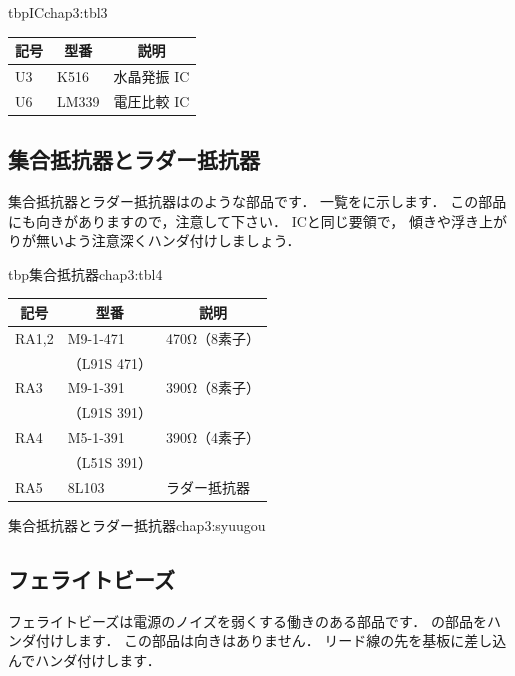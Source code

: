 \begin{mytable}{tbp}{IC}{chap3:tbl3}
{\small\begin{tabular}{l|l|l}
\hline
\hline
\multicolumn{1}{c|}{記号} &
\multicolumn{1}{c|}{型番} &
\multicolumn{1}{c}{説明} \\
\hline
U3 & K516       & 水晶発振 IC \\
U6 & LM339      & 電圧比較 IC \\
\end{tabular}}
\end{mytable}



\subsection{集合抵抗器とラダー抵抗器}
集合抵抗器とラダー抵抗器はのような部品です．
一覧をに示します．
この部品にも向きがありますので，注意して下さい．
ICと同じ要領で，
傾きや浮き上がりが無いよう注意深くハンダ付けしましょう．

\begin{mytable}{tbp}{集合抵抗器}{chap3:tbl4}
{\small\begin{tabular}{l|l|l}
\hline
\hline
\multicolumn{1}{c|}{記号} &
\multicolumn{1}{c|}{型番} &
\multicolumn{1}{c}{説明} \\
\hline
RA1,2 & M9-1-471   & 470Ω（8素子） \\
      &（L91S 471）&               \\
RA3   & M9-1-391   & 390Ω（8素子） \\
      &（L91S 391）&               \\
RA4   & M5-1-391   & 390Ω（4素子） \\
      &（L51S 391）&               \\
RA5   & 8L103      & ラダー抵抗器  \\
\end{tabular}}
\end{mytable}

{集合抵抗器とラダー抵抗器}{chap3:syuugou}

\subsection{フェライトビーズ}
フェライトビーズは電源のノイズを弱くする働きのある部品です．
の部品をハンダ付けします．
この部品は向きはありません．
リード線の先を基板に差し込んでハンダ付けします．

